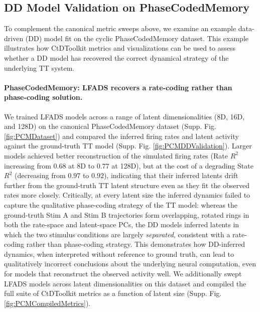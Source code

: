 \documentclass{article}
\begin{document}
\FloatBarrier
\subsection{DD Model Validation on PhaseCodedMemory \label{appendix:DD-PCM-Chaotic}}

To complement the canonical metric sweeps above, we examine an example data-driven (DD) model fit on the cyclic PhaseCodedMemory dataset. This example illustrates how CtDToolkit metrics and visualizations can be used to assess whether a DD model has recovered the correct dynamical strategy of the underlying TT system.

\paragraph{PhaseCodedMemory: LFADS recovers a rate-coding rather than phase-coding solution.}
We trained LFADS models across a range of latent dimensionalities (8D, 16D, and 128D) on the canonical PhaseCodedMemory dataset (Supp. Fig. \ref{fig:PCMDataset}) and compared the inferred firing rates and latent activity against the ground-truth TT model (Supp. Fig. \ref{fig:PCMDDValidation}). Larger models achieved better reconstruction of the simulated firing rates (Rate $R^2$ increasing from $0.68$ at 8D to $0.77$ at 128D), but at the cost of a degrading State $R^2$ (decreasing from $0.97$ to $0.92$), indicating that their inferred latents drift further from the ground-truth TT latent structure even as they fit the observed rates more closely. Critically, at every latent size the inferred dynamics failed to capture the qualitative phase-coding strategy of the TT model: whereas the ground-truth Stim A and Stim B trajectories form overlapping, rotated rings in both the rate-space and latent-space PCs, the DD models inferred latents in which the two stimulus conditions are largely \textit{separated}, consistent with a rate-coding rather than phase-coding strategy. This demonstrates how DD-inferred dynamics, when interpreted without reference to ground truth, can lead to qualitatively incorrect conclusions about the underlying neural computation, even for models that reconstruct the observed activity well. We additionally swept LFADS models across latent dimensionalities on this dataset and compiled the full suite of CtDToolkit metrics as a function of latent size (Supp. Fig. \ref{fig:PCMCompiledMetrics}).
\end{document}
